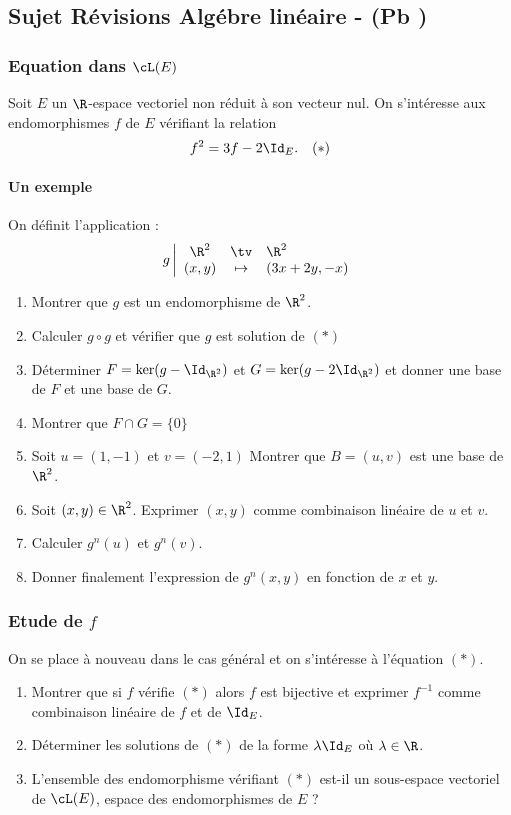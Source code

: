 \subsection{Sujet Révisions Algébre linéaire - (Pb )  }
\subsubsection{Equation dans $\cL(E)$ }

Soit $E$ un  $\R$-espace vectoriel non réduit à son vecteur nul. On s'intéresse aux endomorphismes $f$ de $E$ vérifiant la relation 
$$f^2 =3f - 2\Id_E.\quad (*) $$
\paragraph{Un exemple}



On définit l'application : 
$$g \left| \begin{array}{ccl}
\R^2 &\tv& \R^2 \\
(x,y) &\mapsto & (3x+2y, -x)
\end{array}\right.$$
\begin{enumerate}
\item Montrer que $g$ est un endomorphisme de $\R^2$.
\item Calculer $g\circ g$ et vérifier que $g$ est solution de $(*)$
\item Déterminer $F =\ker(g-\Id_{\R^2}) $ et $G =\ker(g- 2\Id_{\R^2}) $ et donner une base de $F$ et une base de $G$. 
\item Montrer que $F \cap G= \{ 0\}$ 
\item Soit $u =(1,-1) $ et  $v= (-2 , 1) $ Montrer que $B=(u,v) $ est une base de $\R^2$.
\item Soit $(x,y)\in \R^2$. Exprimer $(x,y) $ comme combinaison linéaire de $u$ et $v$.
\item Calculer $g^n(u)$ et $g^n(v)$. 
\item Donner finalement  l'expression de $g^n(x,y) $ en fonction de $x$ et $y$. 

\end{enumerate}
\subsubsection{Etude de $f$}
On se place à nouveau dans le cas général et on s'intéresse à l'équation $(*)$.
\begin{enumerate}
\item Montrer que si $f$ vérifie $(*)$ alors $f$ est bijective et exprimer $f^{-1}$ comme combinaison linéaire de $f$ et de $ \Id_E$. 
\item Déterminer les solutions de $(*)$ de la forme $\lambda \Id_E$ où $\lambda \in \R$. 
\item L'ensemble des endomorphisme vérifiant $(*)$ est-il un sous-espace vectoriel de $\cL(E)$, espace des endomorphismes de $E$ ? 
\end{enumerate}


